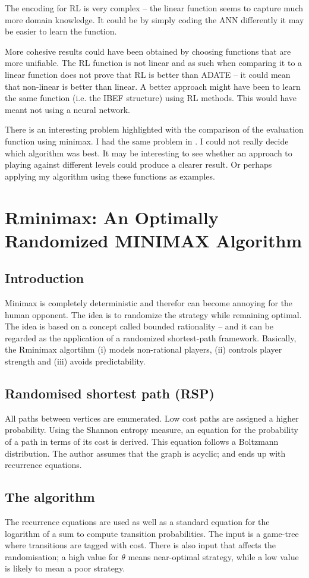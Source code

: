 The encoding for RL is very complex -- the linear function seems to capture much more domain knowledge.  It could be by simply coding the ANN differently it may be easier to learn the function.

More cohesive results could have been obtained by choosing functions that are more unifiable.  The RL function is not linear and as such when comparing it to a linear function does not prove that RL is better than ADATE -- it could mean that non-linear is better than linear.  A better approach might have been to learn the same function (i.e. the IBEF structure) using RL methods.  This would have meant not using a neural network.

There is an interesting problem highlighted with the comparison of the evaluation function using minimax.  I had the same problem in .  I could not really decide which algorithm was best.  It may be interesting to see whether an approach to playing against different levels could produce a clearer result.  Or perhaps applying my algorithm using these functions as examples. 

\section{Rminimax: An Optimally Randomized MINIMAX Algorithm}
\cite{diez:minimax}
\subsection{Introduction} Minimax is completely deterministic and therefor can become annoying for the human opponent.  The idea is to randomize the strategy while remaining optimal.  The idea is based on a concept called bounded rationality -- and it can be regarded as the application of a randomized shortest-path framework.  Basically, the Rminimax algortihm (i) models non-rational players, (ii) controls player strength and (iii) avoids predictability. 
\subsection{Randomised shortest path (RSP)}  All paths between vertices are enumerated.  Low cost paths are assigned a higher probability. Using the Shannon entropy measure, an equation for the probability of a path in terms of its cost is derived.  This equation follows a Boltzmann distribution. The author assumes that the graph is acyclic; and ends up with recurrence equations.
\subsection{The algorithm} The recurrence equations are used as well as a standard equation for the logarithm of a sum to compute transition probabilities. The input is a game-tree where transitions are tagged with cost.  There is also input that affects the randomisation; a high value for $\theta$ means near-optimal strategy, while a low value is likely to mean a poor strategy. 
